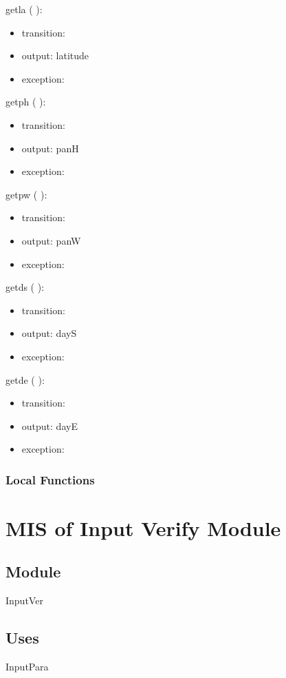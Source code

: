 \documentclass[12pt, titlepage]{article}
\begin{document}
\noindent  getla ( ):
\begin{itemize}
\item transition: 
\item output: latitude
\item exception: 
\end{itemize}

\noindent  getph ( ):
\begin{itemize}
\item transition: 
\item output: panH
\item exception: 
\end{itemize}

\noindent  getpw ( ):
\begin{itemize}
\item transition: 
\item output: panW
\item exception: 
\end{itemize}

\noindent  getds ( ):
\begin{itemize}
\item transition: 
\item output: dayS
\item exception: 
\end{itemize}

\noindent  getde ( ):
\begin{itemize}
\item transition: 
\item output: dayE
\item exception: 
\end{itemize}

\subsubsection{Local Functions}

\section{MIS of Input Verify Module} \label{ModuleIV} 

\subsection{Module}
InputVer

\subsection{Uses}
InputPara
\end{document}
